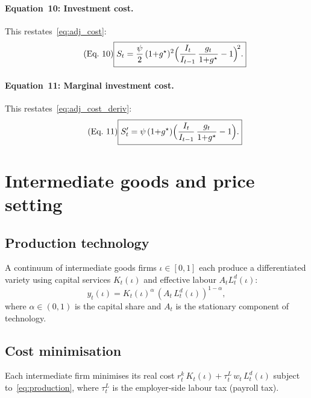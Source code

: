 \documentclass[11pt,a4paper]{article}
\begin{document}
\paragraph{Equation~10: Investment cost.}
This restates~\eqref{eq:adj_cost}:
\begin{equation}\label{eq:eq10}\tag{Eq.~10}
  \boxed{
  S_t = \frac{\psi}{2}\,(1{+}g^{\star})^2
    \Bigl(\frac{I_t}{I_{t-1}}\,\frac{g_t}{1{+}g^{\star}} - 1\Bigr)^{\!2}.}
\end{equation}

\paragraph{Equation~11: Marginal investment cost.}
This restates~\eqref{eq:adj_cost_deriv}:
\begin{equation}\label{eq:eq11}\tag{Eq.~11}
  \boxed{
  S'_t = \psi\,(1{+}g^{\star})
    \Bigl(\frac{I_t}{I_{t-1}}\,\frac{g_t}{1{+}g^{\star}} - 1\Bigr).}
\end{equation}


\section{Intermediate goods and price setting}
\label{sec:prices}

\subsection{Production technology}

A continuum of intermediate goods firms $\iota \in [0,1]$ each produce a
differentiated variety using capital services $K_t(\iota)$ and effective
labour $A_t L^d_t(\iota)$:
\begin{equation}\label{eq:production}
  y_t(\iota) = K_t(\iota)^{\alpha}\,(A_t\,L^d_t(\iota))^{1-\alpha},
\end{equation}
where $\alpha\in(0,1)$ is the capital share and $A_t$ is the stationary
component of technology.

\subsection{Cost minimisation}

Each intermediate firm minimises its real cost $r^k_t\,K_t(\iota) +
\tau^L_t\,w_t\,L^d_t(\iota)$ subject to~\eqref{eq:production}, where
$\tau^L_t$ is the employer-side labour tax (payroll tax).
\end{document}
